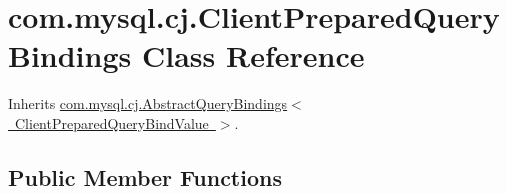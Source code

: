 \hypertarget{classcom_1_1mysql_1_1cj_1_1_client_prepared_query_bindings}{}\section{com.\+mysql.\+cj.\+Client\+Prepared\+Query\+Bindings Class Reference}
\label{classcom_1_1mysql_1_1cj_1_1_client_prepared_query_bindings}


Inherits \mbox{\hyperlink{classcom_1_1mysql_1_1cj_1_1_abstract_query_bindings}{com.\+mysql.\+cj.\+Abstract\+Query\+Bindings$<$ Client\+Prepared\+Query\+Bind\+Value $>$}}.

\subsection*{Public Member Functions}
